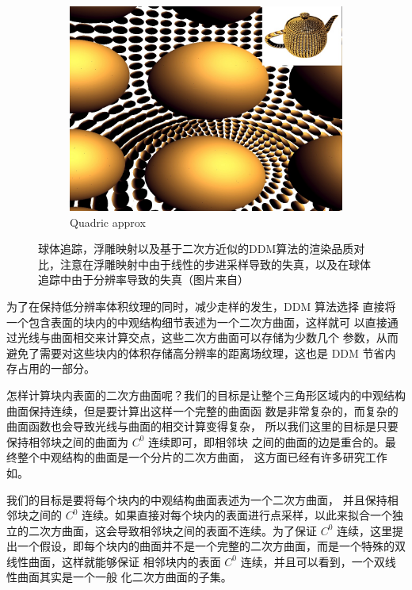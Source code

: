 \begin{figure}
\begin{fullwidth}
\begin{subfigure}[b]{0.202\thewidth}
		\includegraphics[width=\textwidth]{graphics/df/ddm-quadric-approx-2}	
		\caption{Quadric approx}
	\end{subfigure}
	\caption{球体追踪，浮雕映射以及基于二次方近似的DDM算法的渲染品质对比，注意在浮雕映射中由于线性的步进采样导致的失真，以及在球体追踪中由于分辨率导致的失真（图片来自\cite{a:directional-distance-maps}）}
	\label{f:df-ddm-comparation}
\end{fullwidth}	
\end{figure}

为了在保持低分辨率体积纹理的同时，减少走样的发生，DDM 算法选择 直接将一个包含表面的块内的中观结构细节表述为一个二次方曲面，这样就可 以直接通过光线与曲面相交来计算交点，这些二次方曲面可以存储为少数几个 参数，从而避免了需要对这些块内的体积存储高分辨率的距离场纹理，这也是 DDM 节省内存占用的一部分。

怎样计算块内表面的二次方曲面呢？我们的目标是让整个三角形区域内的中观结构曲面保持连续，但是要计算出这样一个完整的曲面函 数是非常复杂的，而复杂的曲面函数也会导致光线与曲面的相交计算变得复杂， 所以我们这里的目标是只要保持相邻块之间的曲面为 $C^{0}$ 连续即可，即相邻块 之间的曲面的边是重合的。最终整个中观结构的曲面是一个分片的二次方曲面， 这方面已经有许多研究工作如\cite{a:Asurveyofmethodsforrecoveringquadricsintrianglemeshes,a:Sparselowdegreeimplicitsurfaceswithapplicationstohighqualityrenderingfeatureextractionandsmoothing,a:Incrementalraycastingofpiecewisequadraticsurfacesonthegpu}。

我们的目标是要将每个块内的中观结构曲面表述为一个二次方曲面， 并且保持相邻块之间的 $C^{0}$ 连续。如果直接对每个块内的表面进行点采样，以此来拟合一个独立的二次方曲面，这会导致相邻块之间的表面不连续。为了保证 $C^{0}$ 连续，这里提出一个假设，即每个块内的曲面并不是一个完整的二次方曲面，而是一个特殊的双线性曲面，这样就能够保证 相邻块内的表面 $C^{0}$ 连续，并且可以看到，一个双线性曲面其实是一个一般 化二次方曲面的子集。

